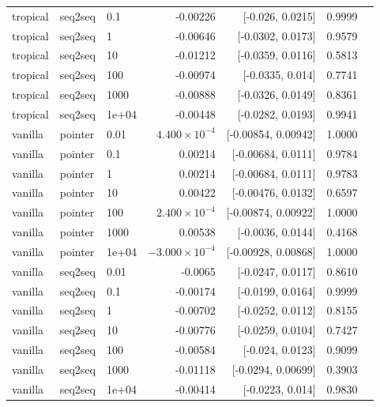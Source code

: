 \documentclass[10pt]{article}
\begin{document}
{\begin{longtable}{lllrrrl}
tropical & seq2seq & 0.1 & -0.00226 & [-0.026, 0.0215] & 0.9999 & \\
tropical & seq2seq & 1 & -0.00646 & [-0.0302, 0.0173] & 0.9579 & \\
tropical & seq2seq & 10 & -0.01212 & [-0.0359, 0.0116] & 0.5813 & \\
tropical & seq2seq & 100 & -0.00974 & [-0.0335, 0.014] & 0.7741 & \\
tropical & seq2seq & 1000 & -0.00888 & [-0.0326, 0.0149] & 0.8361 & \\
tropical & seq2seq & 1e+04 & -0.00448 & [-0.0282, 0.0193] & 0.9941 & \\
vanilla & pointer & 0.01 & $4.400\times10^{-4}$ & [-0.00854, 0.00942] & 1.0000 & \\
vanilla & pointer & 0.1 & 0.00214 & [-0.00684, 0.0111] & 0.9784 & \\
vanilla & pointer & 1 & 0.00214 & [-0.00684, 0.0111] & 0.9783 & \\
vanilla & pointer & 10 & 0.00422 & [-0.00476, 0.0132] & 0.6597 & \\
vanilla & pointer & 100 & $2.400\times10^{-4}$ & [-0.00874, 0.00922] & 1.0000 & \\
vanilla & pointer & 1000 & 0.00538 & [-0.0036, 0.0144] & 0.4168 & \\
vanilla & pointer & 1e+04 & $-3.000\times10^{-4}$ & [-0.00928, 0.00868] & 1.0000 & \\
vanilla & seq2seq & 0.01 & -0.0065 & [-0.0247, 0.0117] & 0.8610 & \\
vanilla & seq2seq & 0.1 & -0.00174 & [-0.0199, 0.0164] & 0.9999 & \\
vanilla & seq2seq & 1 & -0.00702 & [-0.0252, 0.0112] & 0.8155 & \\
vanilla & seq2seq & 10 & -0.00776 & [-0.0259, 0.0104] & 0.7427 & \\
vanilla & seq2seq & 100 & -0.00584 & [-0.024, 0.0123] & 0.9099 & \\
vanilla & seq2seq & 1000 & -0.01118 & [-0.0294, 0.00699] & 0.3903 & \\
vanilla & seq2seq & 1e+04 & -0.00414 & [-0.0223, 0.014] & 0.9830 & \\
\bottomrule
\end{longtable}
}
\end{document}
